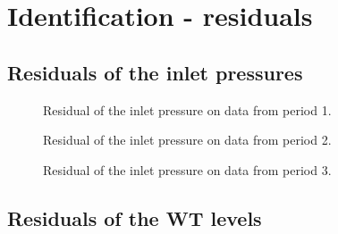 \chapter{Identification - residuals}
\label{identification_residuals}

\section{Residuals of the inlet pressures}
\label{inlet_pres_res}

  \begin{figure}[H]
  \centering
   
  \caption{Residual of the inlet pressure on data from period 1.}
  \label{fig:residual_pk2_p1}
  \end{figure}
 \vspace{-3mm}

  \begin{figure}[H]
  \centering
   
  \caption{Residual of the inlet pressure on data from period 2.}
  \label{fig:residual_pk2_p2}
  \end{figure}
 \vspace{-3mm}

  \begin{figure}[H]
  \centering
   
  \caption{Residual of the inlet pressure on data from period 3.}
  \label{fig:residual_pk2_p3}
  \end{figure}
 \vspace{-3mm}

\section{Residuals of the WT levels}
\label{WT_level_res}


